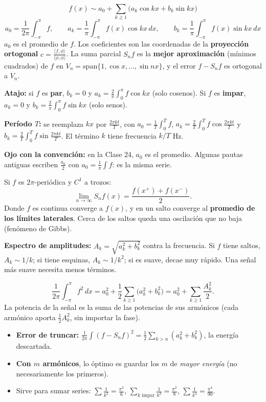 \documentclass[11pt,a4paper]{article}
\begin{document}
\begin{resumen}
\[
f(x)\sim a_0+\sum_{k\ge1}\big(a_k\cos kx+b_k\sin kx\big)
\]
\[
\boxed{a_0=\frac1{2\pi}\int_{-\pi}^\pi f,\qquad a_k=\frac1\pi\int_{-\pi}^\pi f(x)\cos kx\,dx,\qquad b_k=\frac1\pi\int_{-\pi}^\pi f(x)\sin kx\,dx}
\]
$a_0$ es el promedio de $f$. Los coeficientes son las coordenadas de la \textbf{proyección ortogonal} $c=\frac{\langle f,\phi\rangle}{\langle\phi,\phi\rangle}$.
La suma parcial $S_nf$ es la \textbf{mejor aproximación} (mínimos cuadrados) de $f$ en $V_n=\mathrm{span}\{1,\cos x,\dots,\sin nx\}$, y el error $f-S_nf$ es ortogonal a $V_n$.

\textbf{Atajo:} si $f$ es \textbf{par}, $b_k=0$ y $a_k=\frac2\pi\int_0^\pi f\cos kx$ (solo cosenos). Si $f$ es \textbf{impar}, $a_k=0$ y $b_k=\frac2\pi\int_0^\pi f\sin kx$ (solo senos).

\textbf{Período $T$:} se reemplaza $kx$ por $\frac{2\pi kt}{T}$, con $a_0=\frac1T\int_0^Tf$, $a_k=\frac2T\int_0^Tf\cos\frac{2\pi kt}T$ y $b_k=\frac2T\int_0^Tf\sin\frac{2\pi kt}T$. El término $k$ tiene frecuencia $k/T$ Hz.

\textbf{Ojo con la convención:} en la Clase 24, $a_0$ es el promedio. Algunas pautas antiguas escriben $\frac{a_0}2$ con $a_0=\frac1\pi\int f$: es la misma serie.
\end{resumen}

\begin{resumen}
Si $f$ es $2\pi$-periódica y $C^1$ a trozos:
\[
\lim_{n\to\infty}S_nf(x)=\frac{f(x^+)+f(x^-)}2 .
\]
Donde $f$ es continua converge a $f(x)$, y en un salto converge al \textbf{promedio de los límites laterales}. Cerca de los saltos queda una oscilación que no baja (fenómeno de Gibbs).

\textbf{Espectro de amplitudes:} $A_k=\sqrt{a_k^2+b_k^2}$ contra la frecuencia. Si $f$ tiene saltos, $A_k\sim1/k$; si tiene esquinas, $A_k\sim1/k^2$; si es suave, decae muy rápido. Una señal más suave necesita menos términos.
\end{resumen}

\begin{resumen}
\[
\frac1{2\pi}\int_{-\pi}^{\pi}f^2\,dx=a_0^2+\frac12\sum_{k\ge1}\big(a_k^2+b_k^2\big)=a_0^2+\sum_{k\ge1}\frac{A_k^2}2 .
\]
La potencia de la señal es la suma de las potencias de sus armónicos (cada armónico aporta $\frac12A_k^2$, sin importar la fase).
\begin{itemize}[leftmargin=*,itemsep=1pt]
\item \textbf{Error de truncar:} $\frac1{2\pi}\int(f-S_nf)^2=\frac12\sum_{k>n}(a_k^2+b_k^2)$, la energía descartada.
\item \textbf{Con $m$ armónicos}, lo óptimo es guardar los $m$ de \emph{mayor energía} (no necesariamente los primeros).
\item Sirve para sumar series: $\sum\frac1{k^2}=\frac{\pi^2}6$, $\sum_{k\text{ impar}}\frac1{k^2}=\frac{\pi^2}8$, $\sum\frac1{k^4}=\frac{\pi^4}{90}$.
\end{itemize}
\end{resumen}
\end{document}
